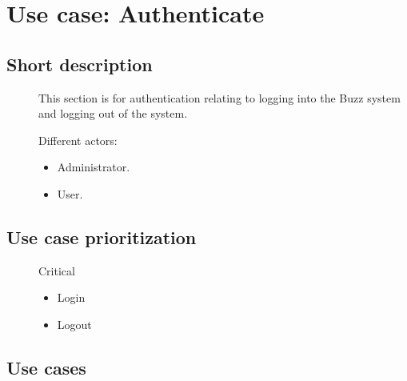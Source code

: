 

	\section{Use case: Authenticate}
	\subsection{Short description}
	\begin{description}
		
		\item[] 
			This section is for authentication relating to logging into the Buzz system and logging out of the system.
		
		\item[] Different actors:
		\begin{itemize}
			\item Administrator.
			\item User.   
		\end{itemize}
		
	\end{description}
	
	\subsection{Use case prioritization}
	\begin{description}
		\item[] Critical
		\begin{itemize}
			\item Login
			\item Logout
		\end{itemize}
	\end{description}
	
	\subsection{Use cases}
	\newpage

